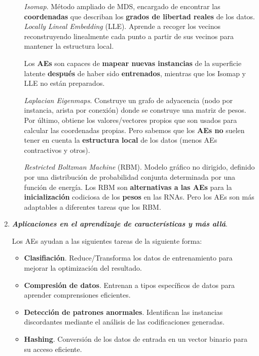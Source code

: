\begin{enumerate}
\begin{enumerate}
        \textit{Isomap}. Método ampliado de MDS, encargado de encontrar las \textbf{coordenadas} que describan los \textbf{grados de libertad reales} de los datos. 
        \textit{Locally Lineal Embedding} (LLE). Aprende a recoger los vecinos reconstruyendo linealmente cada punto a partir de sus vecinos para mantener la estructura local.
        
        Los \textbf{AEs} son capaces de \textbf{mapear nuevas instancias} de la superficie latente \textbf{después} de haber sido \textbf{entrenados}, mientras que los Isomap y LLE no están preparados.
        
        \textit{Laplacian Eigenmaps}. Construye un grafo de adyacencia (nodo por instancia, arista por conexión) donde se construye una matriz de pesos. Por último, obtiene los valores/vectores propios que son usados para calcular las coordenadas propias. Pero sabemos que los \textbf{AEs no} suelen tener en cuenta la \textbf{estructura local} de los datos (menos AEs contractivos y otros).
        
        \textit{Restricted Boltzman Machine} (RBM). Modelo gráfico no dirigido, definido por una distribución de probabilidad conjunta determinada por una función de energía. Los RBM son \textbf{alternativas a las AEs} para la \textbf{inicialización} codiciosa de los \textbf{pesos} en las RNAs. Pero los AEs son más adaptables a diferentes tareas que los RBM.
    
    \end{enumerate}
    
    \item \textbf{\textit{Aplicaciones en el aprendizaje de características y más allá}}.
    \par
    Los AEs ayudan a las siguientes tareas de la siguiente forma:
    \begin{itemize}
        \item \textbf{Clasifiación}. Reduce/Transforma los datos de entrenamiento para mejorar la optimización del resultado.
        
        \item\textbf{Compresión de datos}. Entrenan a tipos específicos de datos para aprender comprensiones eficientes.
        
        \item \textbf{Detección de patrones anormales}. Identifican las instancias discordantes mediante el análisis de las codificaciones generadas.
        
        \item \textbf{Hashing}. Conversión de los datos de entrada en un vector binario para su acceso eficiente.
        

\end{itemize}
\end{enumerate}
